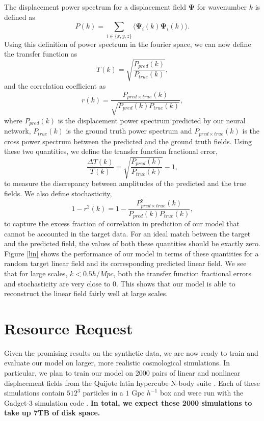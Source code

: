 \documentclass[10pt]{article}
\begin{document}
The displacement power spectrum for a displacement field $\mathbf{\Psi}$ for wavenumber $k$ is defined as
$$
P(k) = \sum_{i \in \{x,y,z\}}\langle\mathbf{\Psi}_i(k)\mathbf{\Psi}_i(k)\rangle.
$$
Using this definition of power spectrum in the fourier space, we can now define the transfer function as
$$
T(k) = \sqrt{\frac{P_{pred}(k)}{P_{true}(k)}},
$$
and the correlation coefficient as
$$
r(k) = \frac{P_{pred \times true}(k)}{\sqrt{P_{pred}(k)P_{true}(k)}},
$$
where $P_{pred}(k)$ is the displacement power spectrum predicted by our neural network, $P_{true}(k)$ is the ground truth power spectrum and $P_{pred \times true}(k)$ is the cross power spectrum between the predicted and the ground truth fields. Using these two quantities, we define the transfer function fractional error,
$$
\frac{\Delta T(k)}{T(k)} = \sqrt{\frac{P_{pred}(k)}{P_{true}(k)}}-1,
$$
to measure the discrepancy between amplitudes of the predicted and the true fields. We also define stochasticity,
$$
1 - r^2(k) = 1 - \frac{P^2_{pred \times true}(k)}{{P_{pred}(k)P_{true}(k)}},
$$
to capture the excess fraction of correlation in prediction of our model that cannot be accounted in the target data. For an ideal match between the target and the predicted field, the values of both these quantities should be exactly zero. Figure \ref{lin} shows the performance of our model in terms of these quantities for a random target linear field and its corresponding predicted linear field. We see that for large scales, $k < 0.5 h/Mpc$, both the transfer function fractional errors and stochasticity are very close to $0$. This shows that our model is able to reconstruct the linear field fairly well at large scales.

\section{Resource Request}

Given the promising results on the synthetic data, we are now ready to train and evaluate our model on larger, more realistic cosmological simulations. In particular, we plan to train our model on 2000 pairs of linear and nonlinear displacement fields from the Quijote latin hypercube N-body suite \cite{quijote}. Each of these simulations contain $512^3$ particles in a $1 \text{ Gpc } h^{-1}$ box and were run with the Gadget-3 simulation code \cite{gadget-3}. \textbf{In total, we expect these 2000 simulations to take up 7TB of disk space.}
\end{document}
